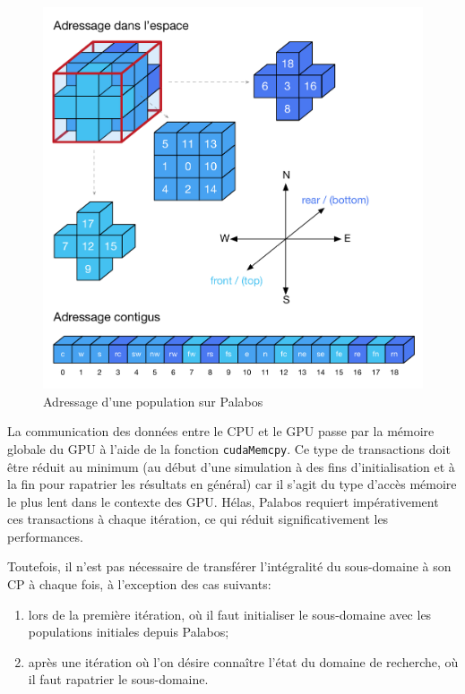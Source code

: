 \begin{figure}[h]
	\centering
	\includegraphics[scale=0.85, fbox]{images/index_population_palabos.pdf}
	\caption{Adressage d'une population sur Palabos}
	\label{fig:plb_population_index}
\end{figure}

La communication des données entre le \acs{CPU} et le \acs{GPU} passe par la mémoire globale du \acs{GPU} à l'aide de la fonction \texttt{cudaMemcpy}. Ce type de transactions doit être réduit au minimum (au début d'une simulation à des fins d'initialisation et à la fin pour rapatrier les résultats en général) car il s'agit du type d'accès mémoire le plus lent dans le contexte des \acs{GPU}. Hélas, Palabos requiert impérativement ces transactions à chaque itération, ce qui réduit significativement les performances.

Toutefois, il n'est pas nécessaire de transférer l'intégralité du sous-domaine à son \ac{CP} à chaque fois, à l'exception des cas suivants:
\begin{enumerate}
\item lors de la première itération, où il faut initialiser le sous-domaine avec les populations initiales depuis Palabos;
\item après une itération où l'on désire connaître l'état du domaine de recherche, où il faut rapatrier le sous-domaine.
\end{enumerate}

